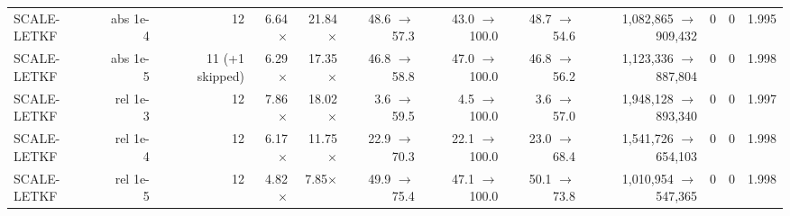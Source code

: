 \begin{tabular}{lrrrrrrrrrrr}
SCALE-LETKF & abs 1e-4 & 12 & 6.64$\times$ & 21.84$\times$ & 48.6 $\to$ 57.3 & 43.0 $\to$ 100.0 & 48.7 $\to$ 54.6 & 1,082,865 $\to$ 909,432 & 0 & 0 & 1.995 \\
SCALE-LETKF & abs 1e-5 & 11 (+1 skipped) & 6.29$\times$ & 17.35$\times$ & 46.8 $\to$ 58.8 & 47.0 $\to$ 100.0 & 46.8 $\to$ 56.2 & 1,123,336 $\to$ 887,804 & 0 & 0 & 1.998 \\
SCALE-LETKF & rel 1e-3 & 12 & 7.86$\times$ & 18.02$\times$ & 3.6 $\to$ 59.5 & 4.5 $\to$ 100.0 & 3.6 $\to$ 57.0 & 1,948,128 $\to$ 893,340 & 0 & 0 & 1.997 \\
SCALE-LETKF & rel 1e-4 & 12 & 6.17$\times$ & 11.75$\times$ & 22.9 $\to$ 70.3 & 22.1 $\to$ 100.0 & 23.0 $\to$ 68.4 & 1,541,726 $\to$ 654,103 & 0 & 0 & 1.998 \\
SCALE-LETKF & rel 1e-5 & 12 & 4.82$\times$ & 7.85$\times$ & 49.9 $\to$ 75.4 & 47.1 $\to$ 100.0 & 50.1 $\to$ 73.8 & 1,010,954 $\to$ 547,365 & 0 & 0 & 1.998 \\
\bottomrule
\end{tabular}

